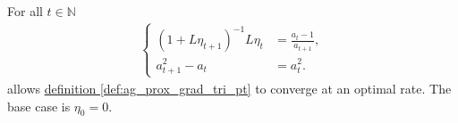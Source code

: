 \documentclass[12pt]{article}
\begin{document}
        \begin{lemma}
            For all $t \in \mathbb N$
            \begin{align*}
                \left\lbrace
                \begin{aligned}
                    (1 + L\eta_{t + 1})^{-1}L \eta_t 
                    &= \frac{a_t - 1}{a_{t + 1}} , 
                    \\
                    a_{t + 1}^2 - a_t &= a_t^2. 
                \end{aligned} 
                \right. 
            \end{align*}
            allows \hyperref[def:ag_prox_grad_tri_pt]{definition \ref*{def:ag_prox_grad_tri_pt}} to converge at an optimal rate. 
            The base case is $\eta_0 = 0$. 
        \end{lemma}
\end{document}

